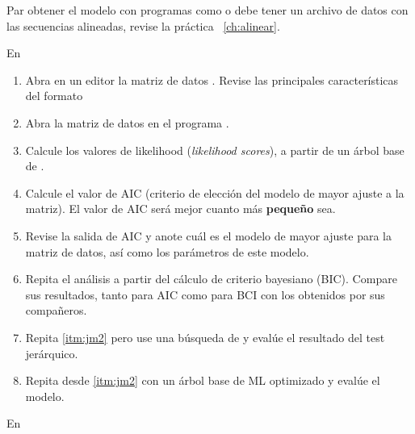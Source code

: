 Par obtener el modelo con programas como  o  debe tener un archivo de datos con las secuencias alineadas, revise la pr\'actica ~\ref{ch:alinear}. 



En 


\begin{enumerate}
	\item  Abra en un editor la matriz de datos . Revise las principales caracter\'isticas del formato 

	\item  Abra la matriz de datos en el programa .
	
	\item\label{itm:jm2} Calcule los valores de likelihood ({\textit{likelihood scores}}), a partir de un \'arbol base de . 
	
	\item Calcule el valor de AIC (criterio de elecci\'on del modelo de mayor ajuste a la matriz). El valor de AIC ser\'a mejor cuanto m\'as \textbf{peque\~no} sea.
	
	\item Revise la salida de AIC y anote cu\'al es el modelo de mayor ajuste para la matriz de datos, as\'i como los par\'ametros de este modelo.
	
	\item Repita el an\'alisis a partir del c\'alculo de criterio bayesiano (BIC). Compare sus resultados, tanto para AIC como para BCI con los obtenidos por sus compa\~neros.

	\item Repita \ref{itm:jm2}  pero use una b\'usqueda de  y eval\'ue el resultado del test jer\'arquico. 

	\item Repita desde \ref{itm:jm2} con un \'arbol base de ML optimizado y eval\'ue el modelo.

\end{enumerate}



En 


